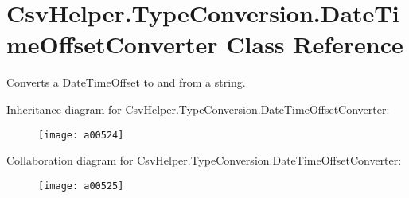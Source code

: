 \hypertarget{a00085}{\section{Csv\-Helper.\-Type\-Conversion.\-Date\-Time\-Offset\-Converter Class Reference}
\label{a00085}
}


Converts a Date\-Time\-Offset to and from a string.  




Inheritance diagram for Csv\-Helper.\-Type\-Conversion.\-Date\-Time\-Offset\-Converter\-:
\nopagebreak
\begin{figure}[H]
\begin{center}
\leavevmode
\texttt{[image: a00524]}
\end{center}
\end{figure}


Collaboration diagram for Csv\-Helper.\-Type\-Conversion.\-Date\-Time\-Offset\-Converter\-:
\nopagebreak
\begin{figure}[H]
\begin{center}
\leavevmode
\texttt{[image: a00525]}
\end{center}
\end{figure}
